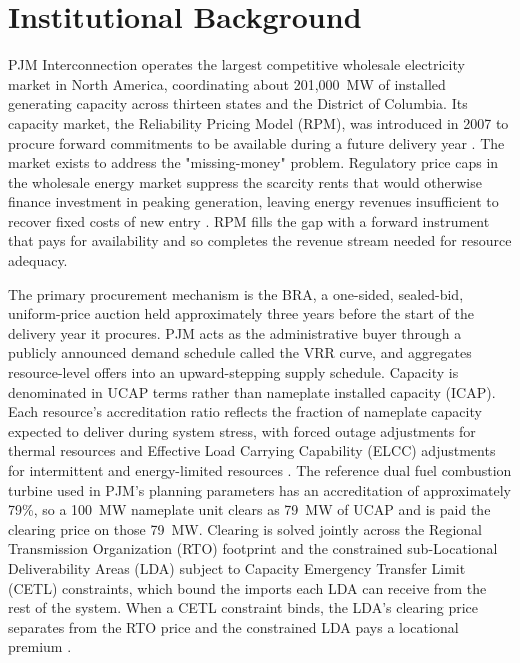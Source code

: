 
\section{Institutional Background}
\label{sec:institutional}

PJM Interconnection operates the largest competitive wholesale
electricity market in North America, coordinating about 201{,}000~MW
of installed generating capacity across thirteen states and the
District of Columbia. Its capacity market, the Reliability Pricing
Model (RPM), was introduced in 2007 to procure forward commitments
to be available during a future delivery year \citep{Bowring2013_pjm,
PJM_Manual18, Pfeifenberger2011_rpm}. The market exists to address
the "missing-money" problem. Regulatory price caps in the
wholesale energy market suppress the scarcity rents that would
otherwise finance investment in peaking generation, leaving energy
revenues insufficient to recover fixed costs of new entry
\citep{Joskow2007_capacity, Joskow2008_capacity_payments,
Cramton2005_capacity}. RPM fills the gap with a forward instrument
that pays for availability and so completes the revenue stream
needed for resource adequacy.

The primary procurement mechanism is the BRA, a one-sided,
sealed-bid, uniform-price auction held approximately three years
before the start of the delivery year it procures. PJM acts as the
administrative buyer through a publicly announced demand schedule
called the VRR curve, and aggregates resource-level offers into an
upward-stepping supply schedule. Capacity is denominated in UCAP
terms rather than nameplate installed capacity (ICAP). Each resource's accreditation ratio reflects the fraction
of nameplate capacity expected to deliver during system stress, with
forced outage adjustments for thermal resources and Effective Load
Carrying Capability (ELCC) adjustments for intermittent and
energy-limited resources \citep{PJM_Manual18, PJM_Manual20A}. The
reference dual fuel combustion turbine used in PJM's planning
parameters has an accreditation of approximately 79\%, so a 100~MW
nameplate unit clears as 79~MW of UCAP and is paid the clearing price
on those 79~MW. Clearing is solved jointly across the Regional
Transmission Organization (RTO) footprint and the
constrained sub-Locational Deliverability Areas (LDA) subject to Capacity Emergency Transfer Limit
(CETL) constraints, which bound the imports each LDA can receive
from the rest of the system. When a CETL constraint binds, the LDA's
clearing price separates from the RTO price and the constrained LDA
pays a locational premium \citep{PJM_Manual20A}.


